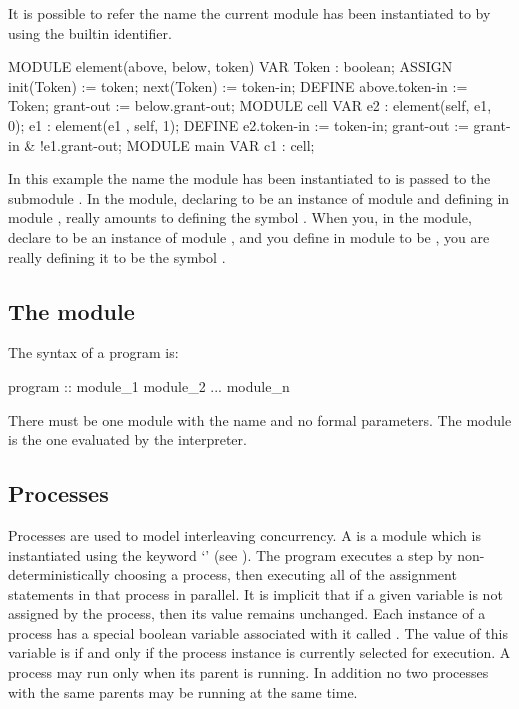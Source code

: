 It is possible to refer the name the current module has been
instantiated to by using the  builtin
identifier.
%
\begin{nusmvCode}
MODULE element(above, below, token)
 VAR
   Token : boolean;
 ASSIGN
   init(Token) := token;
   next(Token) := token-in;
 DEFINE
   above.token-in := Token;
   grant-out := below.grant-out;
MODULE cell
 VAR
   e2 : element(self,   e1, 0);
   e1 : element(e1  , self, 1);
 DEFINE
   e2.token-in := token-in;
   grant-out := grant-in & !e1.grant-out;
MODULE main
 VAR c1 : cell;
\end{nusmvCode}
%
In this example the name the  module has been instantiated
to is passed to the submodule . In the 
module, declaring  to be an instance of module 
and defining  in module , really amounts
to defining the symbol . When you, in the
 module, declare  to be an instance of module
, and you define  in module  to
be , you are really defining it to be the symbol
.

\subsection{The  module}
\label{main module}
%
The syntax of a \nusmv program is:
%
\begin{Grammar}
program ::
        module_1
        module_2
        ...
        module_n
\end{Grammar}
%
There must be one module with the name  and no formal
parameters.  The module  is the one evaluated by the
interpreter.

\subsection{Processes}
\label{processes}
%
Processes are used to model interleaving concurrency. A 
is a module which is instantiated using the keyword `'
(see ). The program executes a step by
non-deterministically choosing a process, then executing all of the
assignment statements in that process in parallel. It is implicit that
if a given variable is not assigned by the process, then its value
remains unchanged. Each instance of a process has a special boolean
variable associated with it called
. The value of this variable is
 if and only if the process instance is currently selected for
execution.  A process may run only when its parent is running. In
addition no two processes with the same parents may be running at the
same time.

